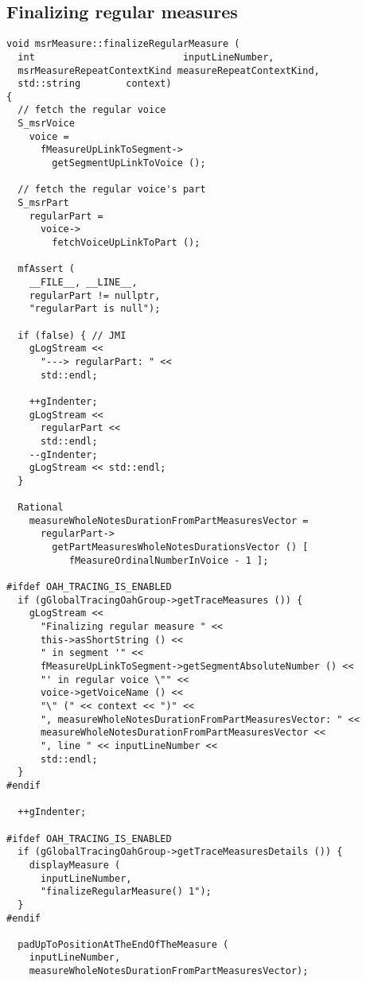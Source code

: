 \subsection{Finalizing regular measures}

\begin{lstlisting}[language=CPlusPlus]
void msrMeasure::finalizeRegularMeasure (
  int                          inputLineNumber,
  msrMeasureRepeatContextKind measureRepeatContextKind,
  std::string        context)
{
  // fetch the regular voice
  S_msrVoice
    voice =
      fMeasureUpLinkToSegment->
        getSegmentUpLinkToVoice ();

  // fetch the regular voice's part
  S_msrPart
    regularPart =
      voice->
        fetchVoiceUpLinkToPart ();

  mfAssert (
    __FILE__, __LINE__,
    regularPart != nullptr,
    "regularPart is null");

  if (false) { // JMI
    gLogStream <<
      "---> regularPart: " <<
      std::endl;

    ++gIndenter;
    gLogStream <<
      regularPart <<
      std::endl;
    --gIndenter;
    gLogStream << std::endl;
  }

  Rational
    measureWholeNotesDurationFromPartMeasuresVector =
      regularPart->
        getPartMeasuresWholeNotesDurationsVector () [
           fMeasureOrdinalNumberInVoice - 1 ];

#ifdef OAH_TRACING_IS_ENABLED
  if (gGlobalTracingOahGroup->getTraceMeasures ()) {
    gLogStream <<
      "Finalizing regular measure " <<
      this->asShortString () <<
      " in segment '" <<
      fMeasureUpLinkToSegment->getSegmentAbsoluteNumber () <<
      "' in regular voice \"" <<
      voice->getVoiceName () <<
      "\" (" << context << ")" <<
      ", measureWholeNotesDurationFromPartMeasuresVector: " <<
      measureWholeNotesDurationFromPartMeasuresVector <<
      ", line " << inputLineNumber <<
      std::endl;
  }
#endif

  ++gIndenter;

#ifdef OAH_TRACING_IS_ENABLED
  if (gGlobalTracingOahGroup->getTraceMeasuresDetails ()) {
    displayMeasure (
      inputLineNumber,
      "finalizeRegularMeasure() 1");
  }
#endif

  padUpToPositionAtTheEndOfTheMeasure (
    inputLineNumber,
    measureWholeNotesDurationFromPartMeasuresVector);


\end{lstlisting}
